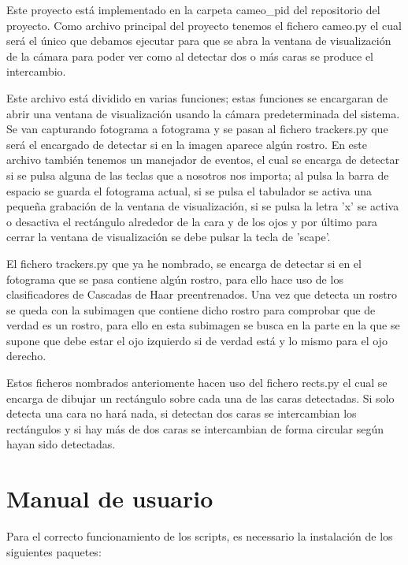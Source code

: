 \documentclass[a4paper]{article}
\begin{document}
Este proyecto está implementado en la carpeta cameo\_pid del repositorio del proyecto.
Como archivo principal del proyecto tenemos el fichero cameo.py el cual será el único que debamos ejecutar para que se abra la ventana de visualización de la cámara para poder ver como al detectar dos o más caras se produce el intercambio.

Este archivo está dividido en varias funciones; estas funciones se encargaran de abrir una ventana de visualización usando la cámara predeterminada del sistema.
Se van capturando fotograma a fotograma y se pasan al fichero trackers.py que será el encargado de detectar si en la imagen aparece algún rostro.
En este archivo también tenemos un manejador de eventos, el cual se encarga de detectar si se pulsa alguna de las teclas que a nosotros nos importa; al pulsa la barra de espacio se guarda el fotograma actual, si se pulsa el tabulador se activa una pequeña grabación de la ventana de visualización, si se pulsa la letra 'x' se activa o desactiva el rectángulo alrededor de la cara y de los ojos y por último para cerrar la ventana de visualización se debe pulsar la tecla de 'scape'.

El fichero trackers.py que ya he nombrado, se encarga de detectar si en el fotograma que se pasa contiene algún rostro, para ello hace uso de los clasificadores de Cascadas de Haar preentrenados.
Una vez que detecta un rostro se queda con la subimagen que contiene dicho rostro para comprobar que de verdad es un rostro, para ello en esta subimagen se busca en la parte en la que se supone que debe estar el ojo izquierdo si de verdad está y lo mismo para el ojo derecho.

Estos ficheros nombrados anteriomente hacen uso del fichero rects.py el cual se encarga de dibujar un rectángulo sobre cada una de las caras detectadas. Si solo detecta una cara no hará nada, si detectan dos caras se intercambian los rectángulos y si hay más de dos caras se intercambian de forma circular según hayan sido detectadas.




\section{Manual de usuario}

Para el correcto funcionamiento de los scripts, es necessario la instalación de los siguientes paquetes:
\end{document}
